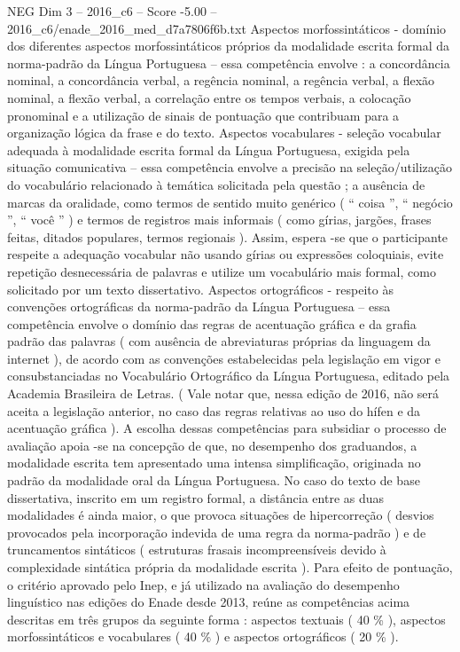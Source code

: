 \begin{textsample}{NEG Dim 3 – 2016\_c6 – Score -5.00 – 2016\_c6/enade\_2016\_med\_d7a7806f6b.txt}
Aspectos morfossintáticos - domínio dos diferentes aspectos morfossintáticos próprios da modalidade escrita formal da norma-padrão da Língua Portuguesa – essa competência envolve : a concordância nominal, a concordância verbal, a regência nominal, a regência verbal, a flexão nominal, a flexão verbal, a correlação entre os tempos verbais, a colocação pronominal e a utilização de sinais de pontuação que contribuam para a organização lógica da frase e do texto.
Aspectos vocabulares - seleção vocabular adequada à modalidade escrita formal da Língua Portuguesa, exigida pela situação comunicativa – essa competência envolve a precisão na seleção/utilização do vocabulário relacionado à temática solicitada pela questão ; a ausência de marcas da oralidade, como termos de sentido muito genérico ( “ coisa ”, “ negócio ”, “ você ” ) e termos de registros mais informais ( como gírias, jargões, frases feitas, ditados populares, termos regionais ).
Assim, espera -se que o participante respeite a adequação vocabular não usando gírias ou expressões coloquiais, evite repetição desnecessária de palavras e utilize um vocabulário mais formal, como solicitado por um texto dissertativo.
Aspectos ortográficos - respeito às convenções ortográficas da norma-padrão da Língua Portuguesa – essa competência envolve o domínio das regras de acentuação gráfica e da grafia padrão das palavras ( com ausência de abreviaturas próprias da linguagem da internet ), de acordo com as convenções estabelecidas pela legislação em vigor e consubstanciadas no Vocabulário Ortográfico da Língua Portuguesa, editado pela Academia Brasileira de Letras. ( Vale notar que, nessa edição de 2016, não será aceita a legislação anterior, no caso das regras relativas ao uso do hífen e da acentuação gráfica ).
A escolha dessas competências para subsidiar o processo de avaliação apoia -se na concepção de que, no desempenho dos graduandos, a modalidade escrita tem apresentado uma intensa simplificação, originada no padrão da modalidade oral da Língua Portuguesa.
No caso do texto de base dissertativa, inscrito em um registro formal, a distância entre as duas modalidades é ainda maior, o que provoca situações de hipercorreção ( desvios provocados pela incorporação indevida de uma regra da norma-padrão ) e de truncamentos sintáticos ( estruturas frasais incompreensíveis devido à complexidade sintática própria da modalidade escrita ).
Para efeito de pontuação, o critério aprovado pelo Inep, e já utilizado na avaliação do desempenho linguístico nas edições do Enade desde 2013, reúne as competências acima descritas em três grupos da seguinte forma : aspectos textuais ( 40 \% ), aspectos morfossintáticos e vocabulares ( 40 \% ) e aspectos ortográficos ( 20 \% ).

\end{textsample}
